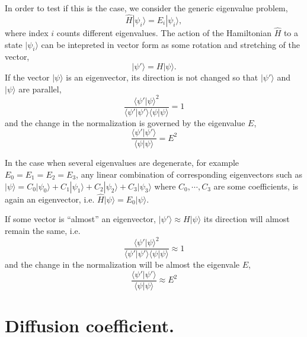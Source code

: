\documentclass[aps,prl,reprint,onecolumn,superscriptaddress,floatfix,longbibliography]{revtex4-2}
\begin{document}
In order to test if this is the case, we consider the generic eigenvalue problem,
\begin{equation}
\hat H|\psi_i\rangle = E_i|\psi_i\rangle,
\end{equation}
where index $i$ counts different eigenvalues. The action of the Hamiltonian $\hat H$ to a state $|\psi_i\rangle$ can be intepreted in vector form as some rotation and stretching of the vector, 
\begin{equation}
|\psi'\rangle = H|\psi\rangle. 
\end{equation}
If the vector $|\psi\rangle$ is an eigenvector, its direction is not changed so that $|\psi'\rangle$ and $|\psi\rangle$ are parallel,
\begin{equation}
\frac{\langle \psi'|\psi\rangle^2}{\langle \psi'|\psi'\rangle\langle \psi|\psi\rangle} = 1
\end{equation}
and the change in the normalization is governed by the eigenvalue $E$,
\begin{equation}
\frac{\langle \psi'|\psi'\rangle}{\langle \psi|\psi\rangle} = E^2
\end{equation}

In the case when several eigenvalues are degenerate, for example 
$E_0 = E_1 = E_2 = E_3$, any linear combination of corresponding eigenvectors such as
$|\psi\rangle = C_0|\psi_0\rangle+C_1|\psi_1\rangle+C_2|\psi_2\rangle+C_3|\psi_3\rangle$ where $C_0,\cdots,C_3$ are some coefficients, is again an eigenvector, i.e. $\hat H|\psi\rangle= E_0|\psi\rangle$.

If some vector is ``almost'' an eigenvector, 
$|\psi'\rangle \approx H|\psi\rangle$ its direction will almost remain the same, i.e.  
\begin{equation}
\frac{\langle \psi'|\psi\rangle^2}{\langle \psi'|\psi'\rangle\langle \psi|\psi\rangle} \approx 1
\end{equation}
and the change in the normalization will be almost the eigenvale $E$,
\begin{equation}
\frac{\langle \psi'|\psi'\rangle}{\langle \psi|\psi\rangle}\approx E^2
\end{equation}

\section{Diffusion coefficient.}
\end{document}
